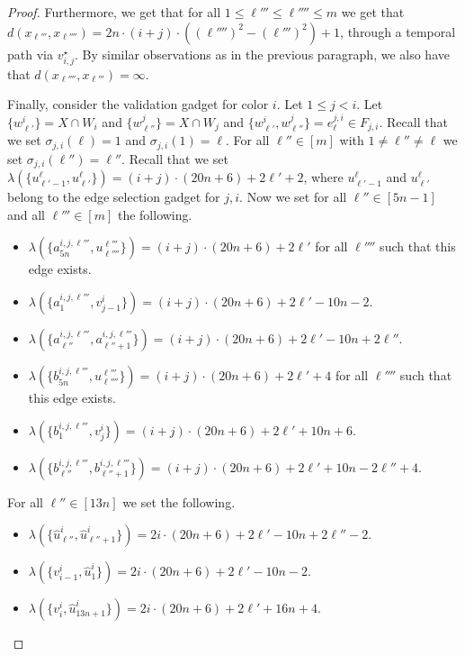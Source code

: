 \documentclass[a4paper,UKenglish,cleveref, autoref, thm-restate]{lipics-v2021}
\begin{document}
\begin{proof}
 Furthermore, we get that for all $1\le \ell'''\le\ell''''\le m$ we get that $d(x_{\ell'''},x_{\ell''''})=2n\cdot (i+j)\cdot((\ell'''')^2-(\ell''')^2)+1$, through a temporal path via $v_{i,j}^\star$.
By similar observations as in the previous paragraph, we also have that $d(x_{\ell''''},x_{\ell'''})=\infty$.

Finally, consider the validation gadget for color $i$. 
Let $1\le j<i$. 
Let $\{w^i_{\ell'}\}=X\cap W_i$ and $\{w^j_{\ell''}\}=X\cap W_j$ and $\{w^i_{\ell'},w^j_{\ell''}\}=e^{j,i}_\ell\in F_{j,i}$. 
Recall that we set $\sigma_{j,i}(\ell)=1$ and $\sigma_{j,i}(1)=\ell$. For all $\ell''\in[m]$ with $1\neq\ell''\neq\ell$ we set $\sigma_{j,i}(\ell'')=\ell''$.
Recall that we set $\lambda(\{u^{\ell}_{\ell'-1},u^{\ell}_{\ell'}\})=(i+j)\cdot (20n+6)+2\ell'+2$, where $u^{\ell}_{\ell'-1}$ and $u^{\ell}_{\ell'}$ belong to the edge selection gadget for $j,i$.
Now we set for all $\ell''\in[5n-1]$ and all $\ell'''\in[m]$ the following.
\begin{itemize}
    \item $\lambda(\{a^{i,j,\ell'''}_{5n},u^{\ell'''}_{\ell''''}\})=(i+j)\cdot (20n+6)+2\ell'$ for all $\ell''''$ such that this edge exists.
    \item $\lambda(\{a^{i,j,\ell'''}_{1},v^i_{j-1}\})=(i+j)\cdot (20n+6)+2\ell'-10n-2$.
    \item $\lambda(\{a^{i,j,\ell'''}_{\ell''},a^{i,j,\ell'''}_{\ell''+1}\})=(i+j)\cdot (20n+6)+2\ell'-10n+2\ell''$.
    \item $\lambda(\{b^{i,j,\ell'''}_{5n},u^{\ell'''}_{\ell''''}\})=(i+j)\cdot (20n+6)+2\ell'+4$ for all $\ell''''$ such that this edge exists.
    \item $\lambda(\{b^{i,j,\ell'''}_{1},v^i_{j}\})=(i+j)\cdot (20n+6)+2\ell'+10n+6$.
    \item $\lambda(\{b^{i,j,\ell'''}_{\ell''},b^{i,j,\ell'''}_{\ell''+1}\})=(i+j)\cdot (20n+6)+2\ell'+10n-2\ell''+4$.
\end{itemize}
For all $\ell''\in[13n]$ we set the following.
\begin{itemize}
    \item $\lambda(\{\hat{u}^i_{\ell''},\hat{u}^i_{\ell''+1}\})=2i\cdot (20n+6)+2\ell'-10n+2\ell''-2$.
    \item $\lambda(\{v^i_{i-1},\hat{u}^i_{1}\})=2i\cdot (20n+6)+2\ell'-10n-2$.
    \item $\lambda(\{v^i_i,\hat{u}^i_{13n+1}\})=2i\cdot (20n+6)+2\ell'+16n+4$.
\end{itemize}

\end{proof}
\end{document}

